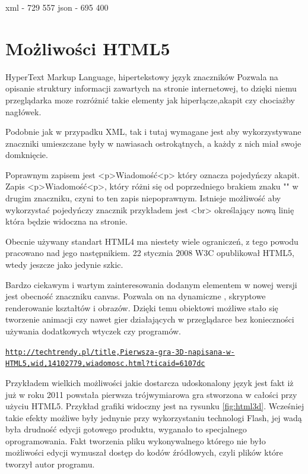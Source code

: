xml - 729  557
json - 695  400


\section{Możliwości HTML5}
\label{sec:html5}

HyperText Markup Language,  hipertekstowy język znaczników
Pozwala na opisanie struktury informacji zawartych na stronie internetowej, to dzięki niemu przeglądarka moze rozróżnić takie elementy jak hiperłącze,akapit czy chociażby nagłówek.

Podobnie jak w przypadku XML, tak i tutaj wymagane jest aby wykorzystywane znaczniki umieszczane były w nawiasach ostrokątnych, a każdy z nich miał swoje domknięcie.

Poprawnym zapisem jest <p>Wiadomość<p> który oznacza pojedyńczy akapit. Zapis <p>Wiadomość<p>, który różni się od poprzedniego brakiem znaku "" w drugim znaczniku, czyni to ten zapis niepoprawnym. Istnieje możliwość aby wykorzystać pojedyńczy znacznik przykładem jest <br> określający nową linię która będzie widoczna na stronie.

Obecnie używany standart HTML4 ma niestety wiele ograniczeń, z tego powodu pracowano nad jego następnikiem. 22 stycznia 2008 W3C opublikował HTML5, wtedy jeszcze jako jedynie szkic.

Bardzo ciekawym i wartym zainteresowania dodanym elementem w nowej wersji jest obecność znaczniku canvas. Pozwala on na dynamiczne , skryptowe renderowanie kształtów i obrazów. Dzięki temu obiektowi możliwe stało się tworzenie animacji czy nawet gier działających w przeglądarce bez konieczności używania dodatkowych wtyczek czy programów.

\underline{\texttt{http://techtrendy.pl/title,Pierwsza-gra-3D-napisana-w-HTML5,wid,14102779,wiadomosc.html?ticaid=6107dc}}

Przykładem wielkich możliwości jakie dostarcza udoskonalony język jest fakt iż już w roku 2011 powstała pierwsza trójwymiarowa gra stworzona w całości przy użyciu HTML5. Przykład grafiki widoczny jest na rysunku \ref{fig:html3d}.
Wcześniej takie efekty możliwe były jednynie przy wykorzystaniu technologi Flash, jej wadą była drudność edycji gotowego produktu, wyganało to specjalnego oprogramowania. Fakt tworzenia pliku wykonywalnego którego nie było możliwości edycji wymuszał dostęp do kodów źródłowych, czyli plików które tworzył autor programu.

